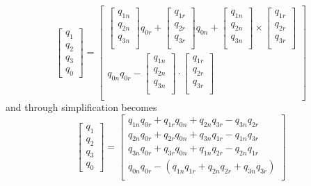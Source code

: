 \begin{equation}
  \begin{bmatrix}
    q_{1} \\
    q_{2} \\
    q_{3} \\
    q_{0}
  \end{bmatrix}
  =
  \begin{bmatrix}
    \begin{bmatrix}
      q_{1n} \\
      q_{2n} \\
      q_{3n} \\
    \end{bmatrix} q_{0r} + \begin{bmatrix}
      q_{1r} \\
      q_{2r} \\
      q_{3r} \\
    \end{bmatrix} q_{0n} + \begin{bmatrix}
      q_{1n} \\
      q_{2n} \\
      q_{3n} \\
    \end{bmatrix} \times \begin{bmatrix}
      q_{1r} \\
      q_{2r} \\
      q_{3r} \\
    \end{bmatrix}
    \\
    q_{0n} q_{0r} - \begin{bmatrix}
      q_{1n} \\
      q_{2n} \\
      q_{3n} \\
    \end{bmatrix} \cdot \begin{bmatrix}
      q_{1r} \\
      q_{2r} \\
      q_{3r} \\
    \end{bmatrix} \\
  \end{bmatrix}
\end{equation}
and through simplification becomes
\begin{equation}
  \begin{bmatrix}
    q_{1} \\
    q_{2} \\
    q_{3} \\
    q_{0}
  \end{bmatrix}
  =
  \begin{bmatrix}
    q_{1n} q_{0r} + q_{1r} q_{0n} + q_{2n} q_{3r} - q_{3n} q_{2r} \\
    q_{2n} q_{0r} + q_{2r} q_{0n} + q_{3n} q_{1r} - q_{1n} q_{3r} \\
    q_{3n} q_{0r} + q_{3r} q_{0n} + q_{1n} q_{2r} - q_{2n} q_{1r} \\
  q_{0n} q_{0r} - (q_{1n} q_{1r} + q_{2n} q_{2r} + q_{3n} q_{3r} ) \\
  \end{bmatrix}
  \label{eqn:rot_nut_product_simplified}
\end{equation}
